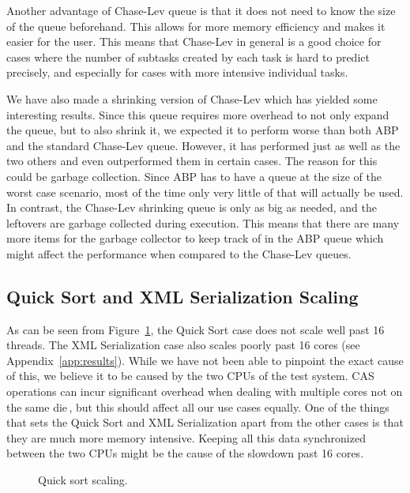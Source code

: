 Another advantage of Chase-Lev queue is that it does not need to know the size of the queue beforehand. This allows for more memory efficiency and makes it easier for the user. This means that Chase-Lev in general is a good choice for cases where the number of subtasks created by each task is hard to predict precisely, and especially for cases with more intensive individual tasks.

We have also made a shrinking version of Chase-Lev which has yielded some interesting results. Since this queue requires more overhead to not only expand the queue, but to also shrink it, we expected it to perform worse than both ABP and the standard Chase-Lev queue. However, it has performed just as well as the two others and even outperformed them in certain cases. The reason for this could be garbage collection. Since ABP has to have a queue at the size of the worst case scenario, most of the time only very little of that will actually be used. In contrast, the Chase-Lev shrinking queue is only as big as needed, and the leftovers are garbage collected during execution. This means that there are many more items for the garbage collector to keep track of in the ABP queue which might affect the performance when compared to the Chase-Lev queues.

\subsection{Quick Sort and XML Serialization Scaling}
As can be seen from Figure~\ref{fig:qsscaling}, the Quick Sort case does not scale well past 16 threads. The XML Serialization case also scales poorly past 16 cores (see Appendix~\ref{app:results}). While we have not been able to pinpoint the exact cause of this, we believe it to be caused by the two CPUs of the test system.
CAS operations can incur significant overhead when dealing with multiple cores not on the same die\,\cite[p. 19--20]{McKenney2008ParallelProgramming}, but this should affect all our use cases equally. One of the things that sets the Quick Sort and XML Serialization apart from the other cases is that they are much more memory intensive. Keeping all this data synchronized between the two CPUs might be the cause of the slowdown past 16 cores.

\begin{figure}
\caption{Quick sort scaling.}
\label{fig:qsscaling}
\end{figure}

